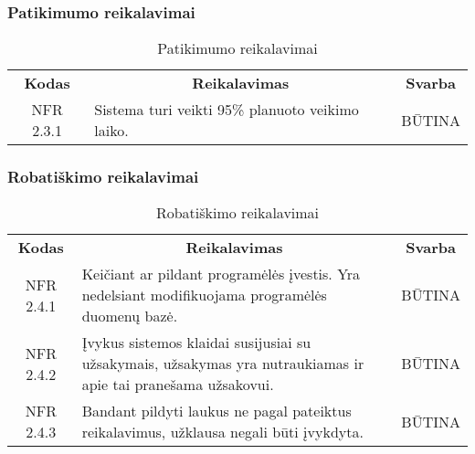 \documentclass{VUMIFPSkursinis}
\begin{document}
\subsubsection{Patikimumo reikalavimai}

\begin{center}
	\begin{table}[H]
	\begin{tabular}{|p{2cm}|p{}|p{}|}
	\hline
	    \rowcolor{lightgray}
		\multicolumn{3}{|c|}{Patikimumo reikalavimai}\\
		
	\hline
		\multicolumn{1}{|c|}{{\bfseries Kodas}}&
		\multicolumn{1}{|c|}{{\bfseries Reikalavimas}}&
		\multicolumn{1}{|c|}{{\bfseries Svarba}}\\
	\hline 	
		\multicolumn{1}{|c|}{NFR 2.3.1}&
		{Sistema turi veikti 95\% planuoto veikimo laiko. }&
		\multicolumn{1}{|c|}{BŪTINA}\\	
	\hline 	 	 	
	\end{tabular}
	\caption{Patikimumo reikalavimai}
	\label{table:Patikimumoreikalavimai}
	\end{table}

\end{center}



\subsubsection{Robatiškimo reikalavimai}

\begin{center}
	\begin{table}[H]
	\begin{tabular}{|p{2cm}|p{}|p{}|}
	\hline
	    \rowcolor{lightgray}
		\multicolumn{3}{|c|}{Robatiškumo reikalavimai}\\
		
	\hline
		\multicolumn{1}{|c|}{{\bfseries Kodas}}&
		\multicolumn{1}{|c|}{{\bfseries Reikalavimas}}&
		\multicolumn{1}{|c|}{{\bfseries Svarba}}\\
	\hline 	
		\multicolumn{1}{|c|}{NFR 2.4.1}&
		{Keičiant ar pildant programėlės įvestis. Yra nedelsiant modifikuojama programėlės duomenų bazė.}&
		\multicolumn{1}{|c|}{BŪTINA}\\
		
	\hline 	
		\multicolumn{1}{|c|}{NFR 2.4.2}&
		{Įvykus sistemos klaidai susijusiai su užsakymais, užsakymas yra nutraukiamas ir apie tai pranešama užsakovui.}&
		\multicolumn{1}{|c|}{BŪTINA}\\
		
	\hline 	
		\multicolumn{1}{|c|}{NFR 2.4.3}&
		{Bandant pildyti laukus ne pagal pateiktus reikalavimus, užklausa negali būti įvykdyta.}&
		\multicolumn{1}{|c|}{BŪTINA}\\
		
	\hline
	
	
	\end{tabular}
	\caption{Robatiškimo reikalavimai}
	\label{table:Robatiškimoreikalavimai}
	\end{table}

\end{center}
\end{document}

